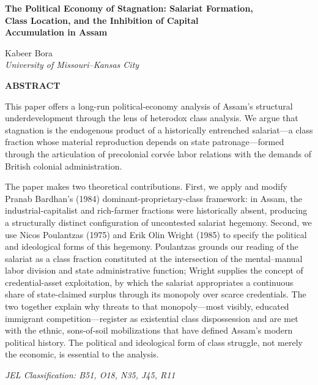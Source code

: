 \documentclass[11pt]{article}
\begin{document}
\begin{center}
{\Large\bfseries The Political Economy of Stagnation: Salariat Formation,\\[2pt]
Class Location, and the Inhibition of Capital\\[2pt]
Accumulation in Assam\par}

\vspace{14pt}

Kabeer Bora\\[2pt]
\textit{University of Missouri--Kansas City}

\vspace{18pt}

\textbf{ABSTRACT}
\end{center}

\vspace{4pt}

This paper offers a long-run political-economy analysis of Assam's structural underdevelopment through the lens of heterodox class analysis. We argue that stagnation is the endogenous product of a historically entrenched salariat---a class fraction whose material reproduction depends on state patronage---formed through the articulation of precolonial corv\'ee labor relations with the demands of British colonial administration.

\vspace{6pt}

The paper makes two theoretical contributions. First, we apply and modify Pranab Bardhan's (1984) dominant-proprietary-class framework: in Assam, the industrial-capitalist and rich-farmer fractions were historically absent, producing a structurally distinct configuration of uncontested salariat hegemony. Second, we use Nicos Poulantzas (1975) and Erik Olin Wright (1985) to specify the political and ideological forms of this hegemony. Poulantzas grounds our reading of the salariat as a class fraction constituted at the intersection of the mental--manual labor division and state administrative function; Wright supplies the concept of credential-asset exploitation, by which the salariat appropriates a continuous share of state-claimed surplus through its monopoly over scarce credentials. The two together explain why threats to that monopoly---most visibly, educated immigrant competition---register as existential class dispossession and are met with the ethnic, sons-of-soil mobilizations that have defined Assam's modern political history. The political and ideological form of class struggle, not merely the economic, is essential to the analysis.

\vspace{12pt}

\textit{JEL Classification: B51, O18, N35, J45, R11}
\end{document}
